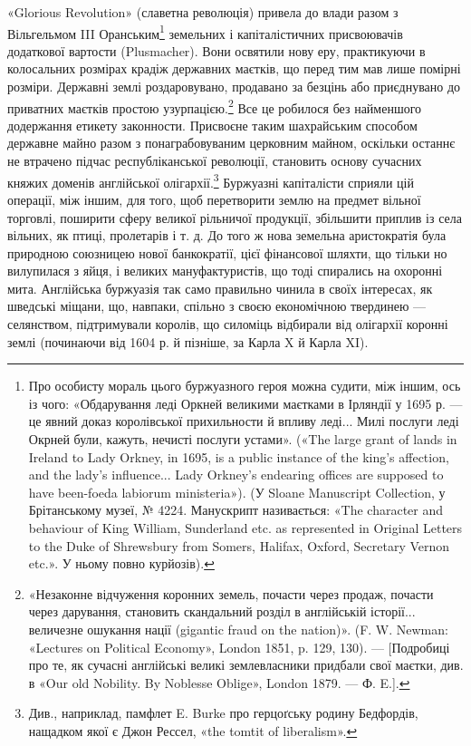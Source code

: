 «Glorious Revolution» (славетна революція) привела до влади
разом з Вільгельмом III Оранським\footnote{
Про особисту мораль цього буржуазного героя можна судити,
між іншим, ось із чого: «Обдарування леді Оркней великими маєтками
в Ірляндії у 1695 р. — це явний доказ королівської прихильности й впливу
леді... Милі послуги леді Окрней були, кажуть, нечисті послуги устами».
(«The large grant of lands in Ireland to Lady Orkney, in 1695, is a public
instance of the king’s affection, and the lady’s influence... Lady Orkney’s
endearing offices are supposed to have been-foeda labiorum ministeria»).
(У Sloane Manuscript Collection, у Брітанському музеї, № 4224.
Манускрипт називається: «The character and behaviour of King William,
Sunderland etc. as represented in Original Letters to the Duke of
Shrewsbury from Somers, Halifax, Oxford, Secretary Vernon etc.». У ньому
повно курйозів).
} земельних і капіталістичних
присвоювачів додаткової вартости (Plusmacher). Вони освятили
нову еру, практикуючи в колосальних розмірах крадіж
державних маєтків, що перед тим мав лише помірні розміри.
Державні землі роздаровувано, продавано за безцінь або приєднувано
до приватних маєтків простою узурпацією.\footnote{
«Незаконне відчуження коронних земель, почасти через продаж,
почасти через дарування, становить скандальний розділ в англійській
історії... величезне ошукання нації (gigantic fraud on the nation)».
(F. W. Newman: «Lectures on Political Economy», London 1851, p. 129,
130). — [Подробиці про те, як сучасні англійські великі землевласники
придбали свої маєтки, див. в «Our old Nobility. By Noblesse Oblige», London
1879. — Ф. E.].
} Все це
робилося без найменшого додержання етикету законности. Присвоєне
таким шахрайським способом державне майно разом з
понаграбовуваним церковним майном, оскільки останнє не втрачено
підчас республіканської революції, становить основу сучасних
княжих доменів англійської олігархії.\footnote{
Див., наприклад, памфлет E. Burke про герцоґську родину
Бедфордів, нащадком якої є Джон Рессел, «the tomtit of liberalism».
} Буржуазні
капіталісти сприяли цій операції, між іншим, для того, щоб
перетворити землю на предмет вільної торговлі, поширити сферу
великої рільничої продукції, збільшити приплив із села вільних,
як птиці, пролетарів і т. д. До того ж нова земельна аристократія
була природною союзницею нової банкократії, цієї фінансової
шляхти, що тільки но вилупилася з яйця, і великих мануфактуристів,
що тоді спирались на охоронні мита. Англійська буржуазія
так само правильно чинила в своїх інтересах, як шведські
міщани, що, навпаки, спільно з своєю економічною твердинею
— селянством, підтримували королів, що силоміць відбирали
від олігархії коронні землі (починаючи від 1604 р. й
пізніше, за Карла X й Карла XI).

